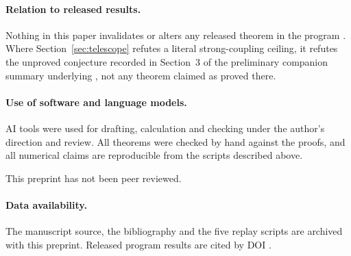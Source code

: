 \documentclass[11pt]{article}
\theoremstyle{definition}
\theoremstyle{remark}
\begin{document}
\paragraph{Relation to released results.}
Nothing in this paper invalidates or alters any released theorem in the
program \cite{barriers1,barriers2,barriers3,largeu,strong,linear5,fisher,capstone}.
Where Section~\ref{sec:telescope} refutes a literal strong-coupling ceiling, it
refutes the unproved conjecture recorded in Section~3 of the preliminary
companion summary underlying \cite{barriers3}, not any theorem claimed as proved
there.

\paragraph{Use of software and language models.}
AI tools were used for drafting, calculation and checking under the author's
direction and review. All theorems were checked by hand against the proofs, and
all numerical claims are reproducible from the scripts described above.

This preprint has not been peer reviewed.

\paragraph{Data availability.}
The manuscript source, the bibliography and the five replay scripts are archived
with this preprint. Released program results are cited by DOI
\cite{barriers1,barriers2,barriers3,largeu,strong,linear5,fisher,capstone,optimum,finiteenergy,stage6}.



\end{document}
